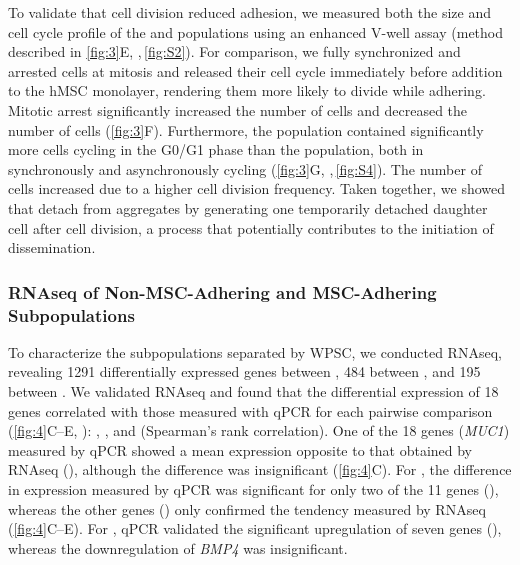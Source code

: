 To validate that cell division reduced adhesion, we measured both the size and
cell cycle profile of the \nMAina and \MAina populations using an enhanced
V-well assay (method described in \autoref{fig:3}E,
,\,\ref{fig:S2}). For comparison, we fully
synchronized and arrested \INA cells at mitosis and released their cell cycle
immediately before addition to the hMSC monolayer, rendering them more likely to
divide while adhering. Mitotic arrest significantly increased the number of
\nMAina cells and decreased the number of \MAina cells (\autoref{fig:3}F).
Furthermore, the \nMAina population contained significantly more cells cycling
in the G0/G1 phase than the \MAina population, both in synchronously and
asynchronously cycling \INA (\autoref{fig:3}G,
,\,\ref{fig:S4}). The number of \nMAina \INA
cells increased due to a higher cell division frequency. Taken together, we
showed that \INA detach from aggregates by generating one temporarily detached
daughter cell after cell division, a process that potentially contributes to the
initiation of dissemination.



\subsubsection*{RNAseq of Non-MSC-Adhering and MSC-Adhering Subpopulations}%
\label{C1:results:RNAseq}%
To characterize the subpopulations separated by WPSC, we conducted RNAseq,
revealing 1291 differentially expressed genes between \versus{\nMAina}{\CMina},
484 between \versus{\MAina}{\CMina}, and 195 between \versus{\MAina}{\nMAina}. We
validated RNAseq and found that the differential expression of 18 genes
correlated with those measured with qPCR for each pairwise comparison
(\autoref{fig:4}C--E, ):
\versus{\nMAina}{\CMina} ,
\versus{\MAina}{\CMina} , and
\versus{\MAina}{\nMAina} 
(Spearman's rank correlation). One of the \SI{18}{} genes (\textit{MUC1})
measured by qPCR showed a mean expression opposite to that obtained by RNAseq
(\versus{\nMAina}{\CMina}), although the difference was insignificant
(\autoref{fig:4}C). For \versus{\nMAina}{\CMina}, the difference in expression
measured by qPCR was significant for only two of the 11 genes
(), whereas the other genes () only confirmed the tendency measured by RNAseq
(\autoref{fig:4}C--E). For \versus{\MAina}{\CMina}, qPCR validated the
significant upregulation of seven genes (), whereas the downregulation of \textit{BMP4} was insignificant.



